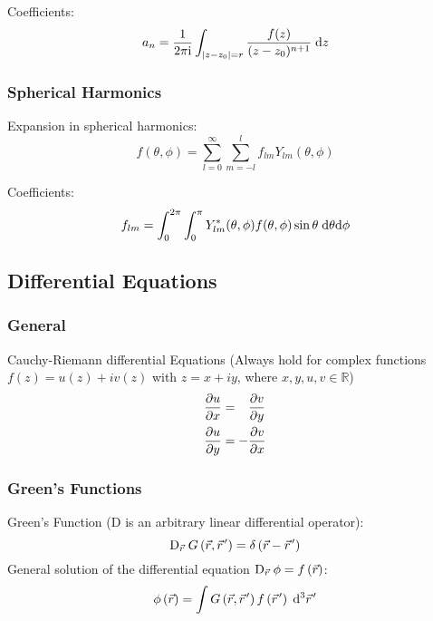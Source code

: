 			\noindent
			Coefficients:
			\begin{equation}
				a_n = \frac{1}{2 \pi \mathrm{i}}\int_{\left| z-z_0 \right| = r} \frac{f(z)}{(z-z_0)^{n+1}}\;\mathrm{d} z
			\end{equation}

		\subsubsection{Spherical Harmonics}
			\noindent
			Expansion in spherical harmonics:
			\begin{equation}
				f(\theta, \phi) = \sum_{l=0}^{\infty} \sum_{m=-l}^{l} f_{lm} Y_{lm}(\theta,\phi)
			\end{equation}

			\noindent
			Coefficients:
			\begin{equation}
				f_{lm} = \int_0^{2\pi} \int_0^\pi Y_{lm}^{*}(\theta,\phi) f(\theta,\phi) \sin\theta\;\mathrm{d}\theta\mathrm{d}\phi
			\end{equation}

	\subsection{Differential Equations}
		\subsubsection{General}
			\noindent
			Cauchy-Riemann differential Equations (Always hold for complex functions $f(z)=u(z)+iv(z)$ with $z=x+iy$, where $x,y,u,v\in\mathbb{R}$)
			\begin{equation}
				\begin{aligned}
					\frac{\partial u}{\partial x} &= \phantom{-}\frac{\partial v}{\partial y} \\
					\frac{\partial u}{\partial y} &= -\frac{\partial v}{\partial x} \\
				\end{aligned}
			\end{equation}


		\subsubsection{Green's Functions}
			\noindent
			Green's Function ($\mathrm{D}$ is an arbitrary linear differential operator):
			\begin{equation}
				\mathrm{D}_{\pvec{r}}\, G\left(\vec{r},\pvec{r}'\right) = \delta\left(\vec{r} - \pvec{r}'\right)
			\end{equation}
			General solution of the differential equation $\mathrm{D}_{\pvec{r}}\, \phi = f\left(\vec{r}\right)$:
			\begin{equation}
				\phi\left(\vec{r}\right) = \int G\left(\vec{r},\pvec{r}'\right)f\left(\pvec{r}'\right)\;\diff^3\pvec{r}'
			\end{equation}


